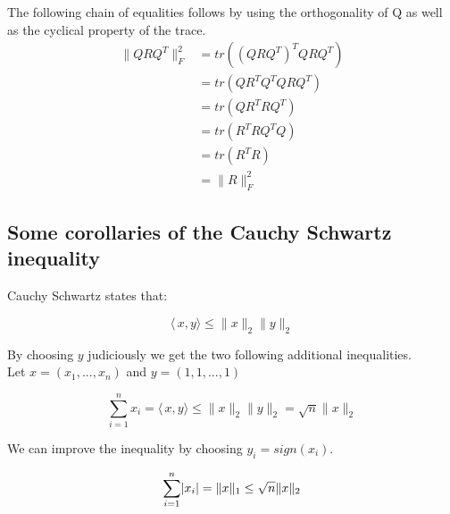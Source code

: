 \documentclass[paper=A4, fontsize=11pt]{scrartcl}
\let\originalleft\left
\let\originalright\right
\renewcommand{\left}{\mathopen{}\mathclose\bgroup\originalleft}
\renewcommand{\right}{\aftergroup\egroup\originalright}
\theoremstyle{remark}
\begin{document}
The following chain of equalities follows by using the orthogonality of
Q as well as the cyclical property of the trace.
\begin{equation}
\begin{aligned}
\|QRQ^{T} \|_{F}^{2}
& =  tr((QRQ^{T})^{T}QRQ^{T}) \\
& =  tr(QR^{T}Q^{T}QRQ^{T}) \\
& =  tr(QR^{T}RQ^{T}) \\
& =  tr(R^{T}RQ^{T}Q) \\
& =  tr(R^{T}R) \\
& =  \|R\|_{F}^{2} 
\end{aligned}
\end{equation}
	
\subsection{Some corollaries of the Cauchy Schwartz inequality} \label{sec:csi}

Cauchy Schwartz states that:

\begin{equation}
\langle\,x,y\rangle \leq \|x\|_{2}\|y\|_{2}
\end{equation}

By choosing $y$ judiciously we get the two following additional inequalities.
\\
Let $x = (x_{1}, ..., x_{n})$ and $y = (1, 1, ..., 1)$

\begin{equation}
\sum_{i=1}^{n} x_{i} = \langle\,x,y\rangle  \leq  \|x\|_{2}\|y\|_{2} = \sqrt{n}\|x\|_{2}
\end{equation}

We can improve the inequality by choosing $y_{i} = sign(x_{i})$. 

\begin{equation}
\sum_{i=1}^{n} \left|x_{i}\right| =  \|x\|_{1}\leq \sqrt{n}\|x\|_{2}
\end{equation}	

\end{document}
